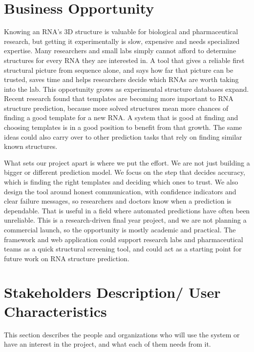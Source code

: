\documentclass{FastFyp}
\begin{document}
\section{Business Opportunity}
Knowing an RNA's 3D structure is valuable for biological and pharmaceutical research, but getting it experimentally is slow, expensive and needs specialized expertise. Many researchers and small labs simply cannot afford to determine structures for every RNA they are interested in. A tool that gives a reliable first structural picture from sequence alone, and says how far that picture can be trusted, saves time and helps researchers decide which RNAs are worth taking into the lab. This opportunity grows as experimental structure databases expand. Recent research found that templates are becoming more important to RNA structure prediction, because more solved structures mean more chances of finding a good template for a new RNA. A system that is good at finding and choosing templates is in a good position to benefit from that growth. The same ideas could also carry over to other prediction tasks that rely on finding similar known structures.

What sets our project apart is where we put the effort. We are not just building a bigger or different prediction model. We focus on the step that decides accuracy, which is finding the right templates and deciding which ones to trust. We also design the tool around honest communication, with confidence indicators and clear failure messages, so researchers and doctors know when a prediction is dependable. That is useful in a field where automated predictions have often been unreliable. This is a research-driven final year project, and we are not planning a commercial launch, so the opportunity is mostly academic and practical. The framework and web application could support research labs and pharmaceutical teams as a quick structural screening tool, and could act as a starting point for future work on RNA structure prediction.

\section{Stakeholders Description/ User Characteristics}
This section describes the people and organizations who will use the system or have an interest in the project, and what each of them needs from it.
\end{document}
